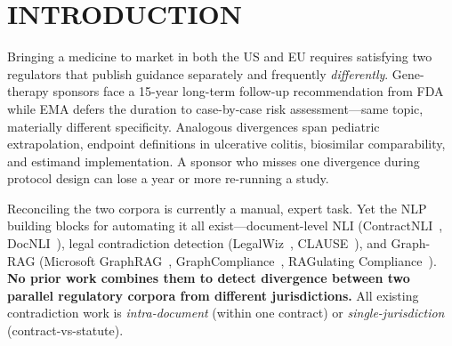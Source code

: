 \documentclass[manuscript]{acmart}
\makeatletter
\let\@acmt@@section\section
\renewcommand{\section}[1]{%
  \@acmt@@section{\texorpdfstring{\MakeUppercase{#1}}{#1}}}
\makeatother
\begin{document}


\maketitle

\section{Introduction}

Bringing a medicine to market in both the US and EU requires satisfying two
regulators that publish guidance separately and frequently \textit{differently}.
Gene-therapy sponsors face a 15-year long-term follow-up recommendation from FDA
while EMA defers the duration to case-by-case risk assessment---same topic,
materially different specificity. Analogous divergences span pediatric
extrapolation, endpoint definitions in ulcerative colitis, biosimilar
comparability, and estimand implementation. A sponsor who misses one divergence
during protocol design can lose a year or more re-running a study.

Reconciling the two corpora is currently a manual, expert task. Yet the NLP
building blocks for automating it all exist---document-level NLI
(ContractNLI~\cite{koreeda2021contractnli}, DocNLI~\cite{yin2021docnli}),
legal contradiction detection (LegalWiz~\cite{legalwiz2025},
CLAUSE~\cite{betterclause2026}), and Graph-RAG (Microsoft
GraphRAG~\cite{edge2024graphrag}, GraphCompliance~\cite{graphcompliance2025},
RAGulating Compliance~\cite{ragulating2025}). \textbf{No prior work combines
them to detect divergence between two parallel regulatory corpora from different
jurisdictions.} All existing contradiction work is \textit{intra-document}
(within one contract) or \textit{single-jurisdiction} (contract-vs-statute).
\end{document}
